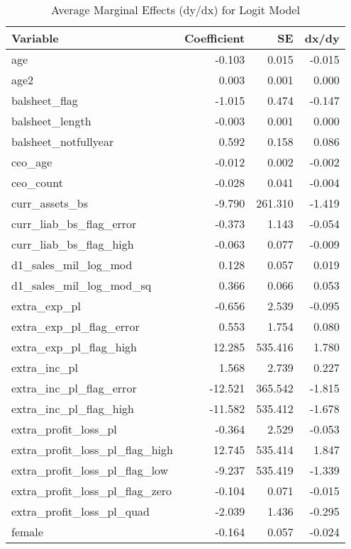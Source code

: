 \begin{table}

\caption{Average Marginal Effects (dy/dx) for Logit Model}
\centering
\begin{tabular}[t]{l|r|r|r}
\hline
Variable & Coefficient & SE & dx/dy\\
\hline
age & -0.103 & 0.015 & -0.015\\
\hline
age2 & 0.003 & 0.001 & 0.000\\
\hline
balsheet\_flag & -1.015 & 0.474 & -0.147\\
\hline
balsheet\_length & -0.003 & 0.001 & 0.000\\
\hline
balsheet\_notfullyear & 0.592 & 0.158 & 0.086\\
\hline
ceo\_age & -0.012 & 0.002 & -0.002\\
\hline
ceo\_count & -0.028 & 0.041 & -0.004\\
\hline
curr\_assets\_bs & -9.790 & 261.310 & -1.419\\
\hline
curr\_liab\_bs\_flag\_error & -0.373 & 1.143 & -0.054\\
\hline
curr\_liab\_bs\_flag\_high & -0.063 & 0.077 & -0.009\\
\hline
d1\_sales\_mil\_log\_mod & 0.128 & 0.057 & 0.019\\
\hline
d1\_sales\_mil\_log\_mod\_sq & 0.366 & 0.066 & 0.053\\
\hline
extra\_exp\_pl & -0.656 & 2.539 & -0.095\\
\hline
extra\_exp\_pl\_flag\_error & 0.553 & 1.754 & 0.080\\
\hline
extra\_exp\_pl\_flag\_high & 12.285 & 535.416 & 1.780\\
\hline
extra\_inc\_pl & 1.568 & 2.739 & 0.227\\
\hline
extra\_inc\_pl\_flag\_error & -12.521 & 365.542 & -1.815\\
\hline
extra\_inc\_pl\_flag\_high & -11.582 & 535.412 & -1.678\\
\hline
extra\_profit\_loss\_pl & -0.364 & 2.529 & -0.053\\
\hline
extra\_profit\_loss\_pl\_flag\_high & 12.745 & 535.414 & 1.847\\
\hline
extra\_profit\_loss\_pl\_flag\_low & -9.237 & 535.419 & -1.339\\
\hline
extra\_profit\_loss\_pl\_flag\_zero & -0.104 & 0.071 & -0.015\\
\hline
extra\_profit\_loss\_pl\_quad & -2.039 & 1.436 & -0.295\\
\hline
female & -0.164 & 0.057 & -0.024\\

\end{tabular}
\end{table}
